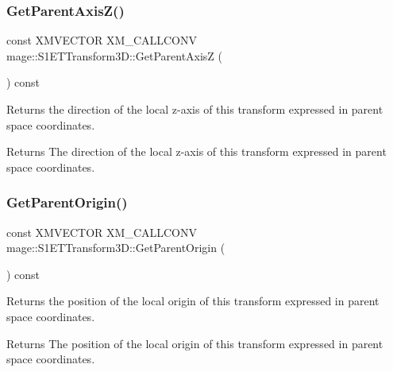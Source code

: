 \subsubsection{\texorpdfstring{Get\+Parent\+Axis\+Z()}{GetParentAxisZ()}}
{\footnotesize\ttfamily const X\+M\+V\+E\+C\+T\+OR X\+M\+\_\+\+C\+A\+L\+L\+C\+O\+NV mage\+::\+S1\+E\+T\+Transform3\+D\+::\+Get\+Parent\+AxisZ (\begin{DoxyParamCaption}{ }\end{DoxyParamCaption}) const\hspace{0.3cm}{\ttfamily [noexcept]}}

Returns the direction of the local z-\/axis of this transform expressed in parent space coordinates.

\begin{DoxyReturn}{Returns}
The direction of the local z-\/axis of this transform expressed in parent space coordinates. 
\end{DoxyReturn}
\mbox{\label{classmage_1_1_s1_e_t_transform3_d_a2b012cb8746fcfa59c3edc59ebc658e8}} 
\subsubsection{\texorpdfstring{Get\+Parent\+Origin()}{GetParentOrigin()}}
{\footnotesize\ttfamily const X\+M\+V\+E\+C\+T\+OR X\+M\+\_\+\+C\+A\+L\+L\+C\+O\+NV mage\+::\+S1\+E\+T\+Transform3\+D\+::\+Get\+Parent\+Origin (\begin{DoxyParamCaption}{ }\end{DoxyParamCaption}) const\hspace{0.3cm}{\ttfamily [noexcept]}}

Returns the position of the local origin of this transform expressed in parent space coordinates.

\begin{DoxyReturn}{Returns}
The position of the local origin of this transform expressed in parent space coordinates. 
\end{DoxyReturn}
\mbox{\label{classmage_1_1_s1_e_t_transform3_d_ac677d710b02f8477eaa2f2e053521032}} 
